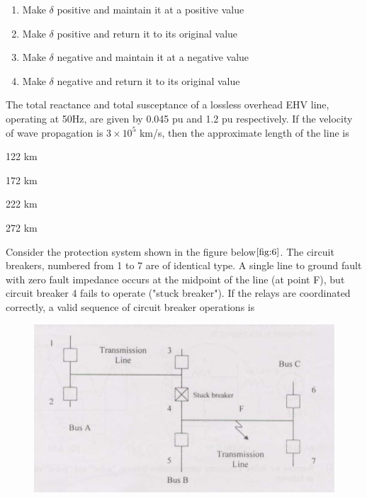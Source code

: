 \begin{enumerate}
        \item Make $\delta$ positive and maintain it at a positive value
        \item Make $\delta$ positive and return it to its original value
        \item Make $\delta$ negative and maintain it at a negative value
        \item Make $\delta$ negative and return it to its original value
\end{enumerate}
\bigskip
\item The total reactance and total susceptance of a lossless overhead EHV line, operating at 50Hz, are given by 0.045 pu and 1.2 pu respectively. If the velocity of wave propagation is $3 \times 10^5$ km/s, then the approximate length of the line is
\begin{enumerate}
    \begin{multicols}{4}
        \item 122 km
        \item 172 km
        \item 222 km
        \item 272 km
    \end{multicols}
\end{enumerate}
\bigskip
\item Consider the protection system shown in the figure below$\ref{fig:6}$. The circuit breakers, numbered from 1 to 7 are of identical type. A single line to ground fault with zero fault impedance occurs at the midpoint of the line (at point F), but circuit breaker 4 fails to operate ("stuck breaker"). If the relays are coordinated correctly, a valid sequence of circuit breaker operations is
\begin{figure}[!ht]
    \centering
    \includegraphics[width=\linewidth]{GATE-yearwise/Assignment2/figs/6.png}
    \caption{}
    \label{fig:6}
    \end{figure}
